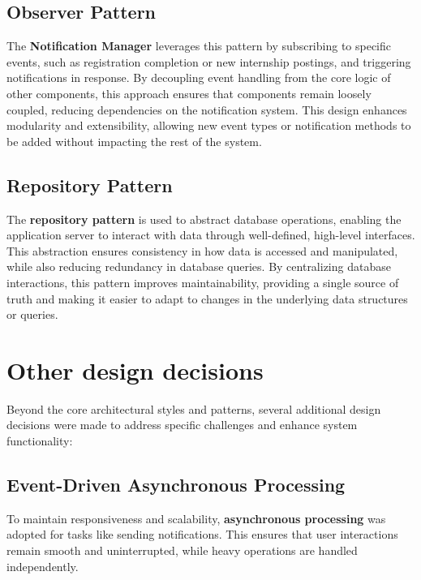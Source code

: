 \subsection{Observer Pattern}
\label{subsec:observer_pattern}%

The \textbf{Notification Manager} leverages this pattern by subscribing to specific events, such as registration completion or new internship postings, and triggering notifications in response. By decoupling event handling from the core logic of other components, this approach ensures that components remain loosely coupled, reducing dependencies on the notification system. This design enhances modularity and extensibility, allowing new event types or notification methods to be added without impacting the rest of the system.

\subsection{Repository Pattern}
\label{subsec:repository_pattern}%

The \textbf{repository pattern} is used to abstract database operations, enabling the application server to interact with data through well-defined, high-level interfaces. This abstraction ensures consistency in how data is accessed and manipulated, while also reducing redundancy in database queries. By centralizing database interactions, this pattern improves maintainability, providing a single source of truth and making it easier to adapt to changes in the underlying data structures or queries.

\newpage

\section{Other design decisions}
\label{sec:other_design_dec}%

Beyond the core architectural styles and patterns, several additional design decisions were made to address specific challenges and enhance system functionality:

\subsection{Event-Driven Asynchronous Processing}

To maintain responsiveness and scalability, \textbf{asynchronous processing} was adopted for tasks like sending notifications. This ensures that user interactions remain smooth and uninterrupted, while heavy operations are handled independently.

